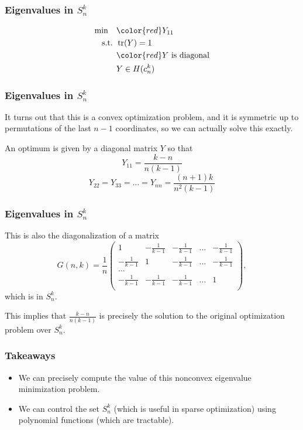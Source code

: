 \documentclass{beamer}
\DeclareMathOperator{\tr}{tr}
\newcommand{\st}{{\text{ s.t. }}}
\begin{document}
\begin{frame}
    \frametitle{Eigenvalues in $S^k_n$}
    \begin{equation*}
        \begin{aligned}
            \min\quad & {\color{red}Y_{11}}\\
            \st & \tr(Y) = 1\\
                & {\color{red}Y \text{ is diagonal}}\\
                & Y \in H(c_n^k)
        \end{aligned}
    \end{equation*}
\end{frame}
\begin{frame}
    \frametitle{Eigenvalues in $S^k_n$}
    It turns out that this is a convex optimization problem, and it is symmetric up to permutations of the last $n-1$ coordinates, so we can actually solve this exactly.
    
    An optimum is given by a diagonal matrix $Y$ so that 
    \[
        Y_{11} = \frac{k-n}{n(k-1)}
    \]
    \[
        Y_{22} = Y_{33}  =\dots= Y_{nn} = \frac{(n+1)k}{n^2(k-1)}
    \]
\end{frame}
\begin{frame}
    \frametitle{Eigenvalues in $S^k_n$}
    This is also the diagonalization of a matrix
    \[
        G(n,k) = 
        \frac{1}{n}
        \begin{pmatrix}
            1 & -\frac{1}{k-1} & -\frac{1}{k-1}  &\dots& -\frac{1}{k-1}\\
            -\frac{1}{k-1} & 1 & -\frac{1}{k-1}  &\dots& -\frac{1}{k-1}\\
            \dots\\
            -\frac{1}{k-1} & -\frac{1}{k-1}& -\frac{1}{k-1}  &\dots & 1\\
        \end{pmatrix},
    \]
    which is in $S^k_n$.

    This implies that $\frac{k-n}{n(k-1)}$ is precisely the solution to the original optimization problem over $S^k_n$.
\end{frame}
\begin{frame}
    \frametitle{Takeaways}
    \begin{itemize}
        \item We can precisely compute the value of this nonconvex eigenvalue minimization problem.
        \item We can control the set $S^k_n$ (which is useful in sparse optimization) using polynomial functions (which are tractable).
    \end{itemize}
\end{frame}
\end{document}
